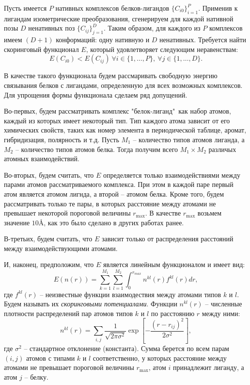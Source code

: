 \documentclass[preprint,12pt,3p]{elsarticle}
\begin{document}
Пусть имеется $P$ нативных комплексов белков-лигандов $\{C_{i0}\}_{i=1}^P$. Применив к лигандам изометрические преобразования, сгенерируем для каждой нативной позы $D$ ненативных поз $\{C_{ij}\}_{j=1}^D$. Таким образом, для каждого из $P$ комплексов имеем $(D + 1)$ конформаций: одну нативную и $D$ ненативных. Требуется найти скоринговый функционал $E$, который удовлетворяет следующим неравенствам: 
\begin{equation}\label{eq1}
E(C_{i0}) < E(C_{ij}) \ \forall i\in\{1,\dots,P\}, \ \forall j\in\{1,\dots,D\}.
\end{equation}

В качестве такого функционала будем рассмаривать свободную энергию связывания белков с лигандами, определенную для всех возможных комплексов. Для упрощения формы функционала сделаем ряд допущений.

Во-первых, будем рассматривать комплекс "белок-лиганд"\ как набор атомов, каждый из которых имеет некоторый тип. Тип каждого атома зависит от его химических свойств, таких как номер элемента в периодической таблице, аромат, гибридизация, полярность и т.д. Пусть $M_1$ -- количество типов атомов лиганда, а $M_2$ -- количество типов атомов белка. Тогда получим всего $M_1\times M_2$ различых атомных взаимодействий.

Во-вторых, будем считать, что $E$ определяется только взаимодействиями между парами атомов рассматриваемого комплекса. При этом в каждой паре первый атом является атомом лигнда, а второй -- атомом белка. Кроме того, будем рассматривать только те пары, в которых расстояние между атомами не превышает некоторой пороговой величины $r_{\max}$. В качестве $r_{\max}$ возьмем значение $10$\AA, как это было сделано в других работах \cite{rmax1,rmax2,rmax3,rmax4,rmax5,rmax6} ранее. 

В-третьих, будем считать, что $E$ зависит только от распределения расстояний между взаимодействующими атомами. 

И, наконец, предположим, что $E$ является линейным функционалом и имеет вид: 
\begin{equation}\label{eq2}
E(n(r)) = \sum_{k=1}^{M_1}\sum_{l=1}^{M_2}\int_{0}^{r_{max}}n^{kl}(r)f^{kl}(r)dr,
\end{equation}
где $f^{kl}(r)$ -- неизвестные функции взаимодествия между атомами типов $k$ и $l$. Будем называть их \textit{скоринговыми потенциалами}. Функции $n^{kl}(r)$ -- численные плотности распределений пар атомов типов $k$ и $l$ по расстоянию $r$ между ними: 
\begin{equation}\label{eq3}
n^{kl}(r) = \sum_{i,j} \frac{1}{\sqrt{2\pi\sigma^2}} \exp\left[{-\frac{(r-r_{ij})^2}{2\sigma^2}}\right],
\end{equation}
где $\sigma^2$ -- стандартное отклонение (константа). Сумма берется по всем парам $(i, j)$ атомов с типами $k$ и $l$ соответственно, у которых расстояние между атомами не превышает пороговой величины $r_{\max}$, атом $i$ принадлежит лиганду, а атом $j$ -- белку.
\end{document}
